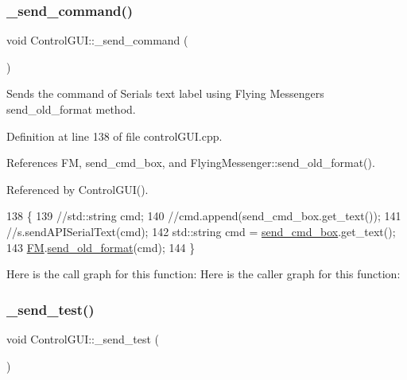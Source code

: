 \subsubsection{\texorpdfstring{\+\_\+send\+\_\+command()}{\_send\_command()}}
{\footnotesize\ttfamily void Control\+G\+U\+I\+::\+\_\+send\+\_\+command (\begin{DoxyParamCaption}{ }\end{DoxyParamCaption})}



Sends the command of Serial\textquotesingle{}s text label using Flying Messenger\textquotesingle{}s send\+\_\+old\+\_\+format method. 



Definition at line 138 of file control\+G\+U\+I.\+cpp.



References FM, send\+\_\+cmd\+\_\+box, and Flying\+Messenger\+::send\+\_\+old\+\_\+format().



Referenced by Control\+G\+U\+I().


\begin{DoxyCode}
138                                \{
139     \textcolor{comment}{//std::string cmd;}
140     \textcolor{comment}{//cmd.append(send\_cmd\_box.get\_text());}
141     \textcolor{comment}{//s.sendAPISerialText(cmd);}
142     std::string cmd = \hyperlink{class_control_g_u_i_a0cafb8350874db85af1fc59d21b61451}{send\_cmd\_box}.get\_text();
143     \hyperlink{class_control_g_u_i_a16612b604257a888faac7a1d7e9e3e51}{FM}.\hyperlink{class_flying_messenger_a7dd37ffc3394c87f190cbf6dc9405304}{send\_old\_format}(cmd);
144 \}
\end{DoxyCode}
Here is the call graph for this function\+:
Here is the caller graph for this function\+:
\mbox{\label{class_control_g_u_i_a0838b5d3b0d6651b7a1a58928bc83327}} 
\subsubsection{\texorpdfstring{\+\_\+send\+\_\+test()}{\_send\_test()}}
{\footnotesize\ttfamily void Control\+G\+U\+I\+::\+\_\+send\+\_\+test (\begin{DoxyParamCaption}{ }\end{DoxyParamCaption})}



